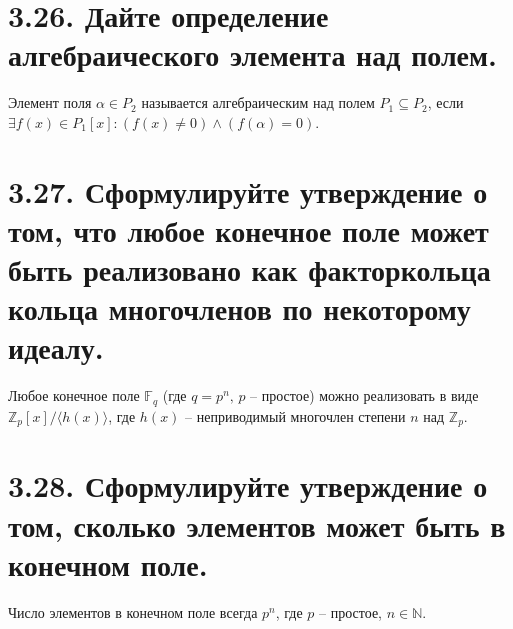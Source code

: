 \documentclass{article}
\begin{document}
\section*{\LARGE 3.26. Дайте определение алгебраического элемента над полем. }
Элемент поля $\alpha \in P_2$ называется алгебраическим над полем $P_1 \subseteq P_2$, если $\exists f(x) \in P_1[x] : (f(x) \ne 0) \wedge (f(\alpha) = 0)$.

\section*{\LARGE 3.27. Сформулируйте утверждение о том, что любое конечное поле может быть реализовано как факторкольца кольца многочленов по некоторому идеалу. }
Любое конечное поле $\mathbb{F}_q$ (где $q = p^n,\, p$ -- простое) можно реализовать в виде $\mathbb{Z}_p[x] / \langle h(x) \rangle$, где $h(x)$ -- неприводимый многочлен степени $n$ над $\mathbb{Z}_p$.

\section*{\LARGE 3.28. Сформулируйте утверждение о том, сколько элементов может быть в конечном поле. }
Число элементов в конечном поле всегда $p^n$, где $p$ -- простое, $n \in \mathbb{N}$.

\end{document}
